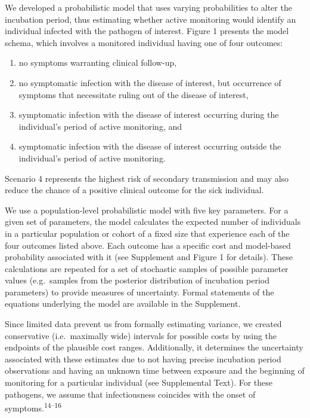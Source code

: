 \documentclass[]{article}
\providecommand{\tightlist}{%
  \setlength{\itemsep}{0pt}\setlength{\parskip}{0pt}}
\begin{document}
We developed a probabilistic model that uses varying probabilities to
alter the incubation period, thus estimating whether active monitoring
would identify an individual infected with the pathogen of interest.
Figure 1 presents the model schema, which involves a monitored
individual having one of four outcomes:

\begin{enumerate}
\def\labelenumi{\arabic{enumi}.}
\tightlist
\item
  no symptoms warranting clinical follow-up,
\item
  no symptomatic infection with the disease of interest, but occurrence
  of symptoms that necessitate ruling out of the disease of interest,
\item
  symptomatic infection with the disease of interest occurring during
  the individual's period of active monitoring, and
\item
  symptomatic infection with the disease of interest occurring outside
  the individual's period of active monitoring.
\end{enumerate}

Scenario 4 represents the highest risk of secondary transmission and may
also reduce the chance of a positive clinical outcome for the sick
individual.

We use a population-level probabilistic model with five key parameters.
For a given set of parameters, the model calculates the expected number
of individuals in a particular population or cohort of a fixed size that
experience each of the four outcomes listed above. Each outcome has a
specific cost and model-based probability associated with it (see
Supplement and Figure 1 for details). These calculations are repeated
for a set of stochastic samples of possible parameter values
(e.g.~samples from the posterior distribution of incubation period
parameters) to provide measures of uncertainty. Formal statements of the
equations underlying the model are available in the Supplement.

Since limited data prevent us from formally estimating variance, we
created conservative (i.e.~maximally wide) intervals for possible costs
by using the endpoints of the plausible cost ranges. Additionally, it
determines the uncertainty associated with these estimates due to not
having precise incubation period observations and having an unknown time
between exposure and the beginning of monitoring for a particular
individual (see Supplemental Text). For these pathogens, we assume that
infectiousness coincides with the onset of
symptoms.\textsuperscript{14--16}
\end{document}

